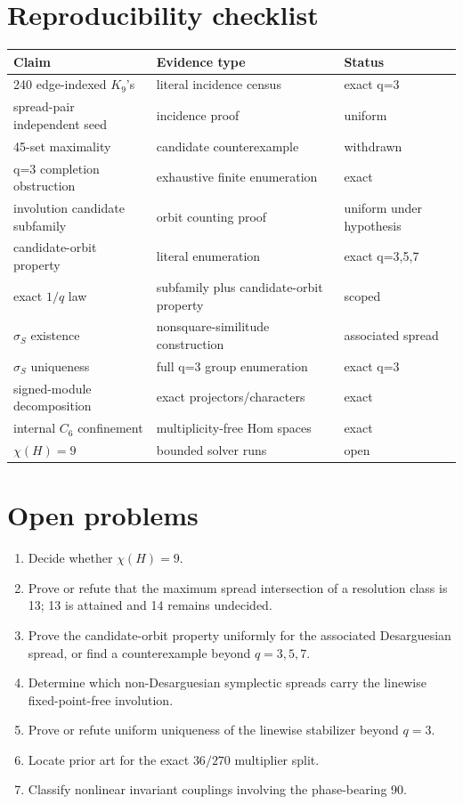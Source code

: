 \documentclass[11pt]{article}
\begin{document}
\section{Reproducibility checklist}
\begin{center}
\begin{tabular}{lll}
\toprule
Claim & Evidence type & Status\\
\midrule
240 edge-indexed \(K_9\)'s & literal incidence census & exact q=3\\
spread-pair independent seed & incidence proof & uniform\\
45-set maximality & candidate counterexample & withdrawn\\
q=3 completion obstruction & exhaustive finite enumeration & exact\\
involution candidate subfamily & orbit counting proof & uniform under hypothesis\\
candidate-orbit property & literal enumeration & exact q=3,5,7\\
exact \(1/q\) law & subfamily plus candidate-orbit property & scoped\\
\(\sigma_S\) existence & nonsquare-similitude construction & associated spread\\
\(\sigma_S\) uniqueness & full q=3 group enumeration & exact q=3\\
signed-module decomposition & exact projectors/characters & exact\\
internal \(C_6\) confinement & multiplicity-free Hom spaces & exact\\
\(\chi(H)=9\) & bounded solver runs & open\\
\bottomrule
\end{tabular}
\end{center}

\section{Open problems}
\begin{enumerate}
\item Decide whether \(\chi(H)=9\).
\item Prove or refute that the maximum spread intersection of a resolution class
is 13; 13 is attained and 14 remains undecided.
\item Prove the candidate-orbit property uniformly for the associated
Desarguesian spread, or find a counterexample beyond \(q=3,5,7\).
\item Determine which non-Desarguesian symplectic spreads carry the linewise
fixed-point-free involution.
\item Prove or refute uniform uniqueness of the linewise stabilizer beyond
\(q=3\).
\item Locate prior art for the exact \(36/270\) multiplier split.
\item Classify nonlinear invariant couplings involving the phase-bearing 90.
\end{enumerate}
\end{document}
